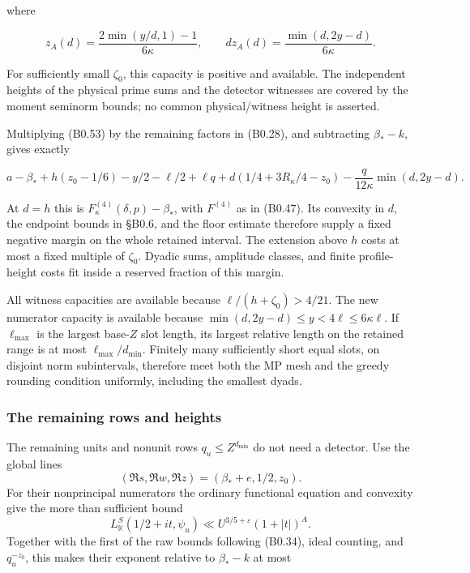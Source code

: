 \documentclass[11pt,a4paper]{article}
\begin{document}
where

\[
z_A(d)=\frac{2\min(y/d,1)-1}{6\kappa},\qquad
d z_A(d)=\frac{\min(d,2y-d)}{6\kappa}.
\tag{B0.54}
\]

For sufficiently small \(\zeta_0\), this capacity is positive and
available. The independent heights of the physical prime sums and the
detector witnesses are covered by the moment seminorm bounds; no common
physical/witness height is asserted.

Multiplying (B0.53) by the remaining factors in (B0.28), and subtracting
\(\beta_*-k\), gives exactly

\[
a-\beta_*+h(z_0-1/6)-y/2-\ell/2+\ell q
+d(1/4+3R_\kappa/4-z_0)
-\frac q{12\kappa}\min(d,2y-d).
\tag{B0.55}
\]

At \(d=h\) this is \(F^{(4)}_\kappa(\delta,\allowbreak{}p)-\beta_*\), with
\(F^{(4)}\) as in (B0.47). Its convexity in \(d\), the endpoint bounds
in §B0.6, and the floor estimate therefore supply a fixed negative
margin on the whole retained interval. The extension above \(h\) costs
at most a fixed multiple of \(\zeta_0\). Dyadic sums, amplitude classes,
and finite profile-height costs fit inside a reserved fraction of this
margin.

All witness capacities are available because \(\ell/(h+\zeta_0)>4/21\).
The new numerator capacity is available because
\(\min(d,\allowbreak{}2y-d)\le y<4\ell\le6\kappa\ell\). If \(\ell_{\max}\) is the
largest base-\(Z\) slot length, its largest relative length on the
retained range is at most \(\ell_{\max}/d_{\min}\). Finitely many
sufficiently short equal slots, on disjoint norm subintervals, therefore
meet both the MP mesh and the greedy rounding condition uniformly,
including the smallest dyads.

\hypertarget{the-remaining-rows-and-heights}{%
\subsubsection{The remaining rows and
heights}\label{the-remaining-rows-and-heights}}

The remaining units and nonunit rows \(q_u\le Z^{d_{\min}}\) do not need
a detector. Use the global lines \[
(\Re s,\Re w,\Re z)=(\beta_*+e,1/2,z_0).
\] For their nonprincipal numerators the ordinary functional equation
and convexity give the more than sufficient bound \[
L_{\mathbb K}^S(1/2+it,\psi_u)\ll U^{3/5+\varepsilon}(1+|t|)^A.
\] Together with the first of the raw bounds following (B0.34), ideal
counting, and \(q_u^{-z_0}\), this makes their exponent relative to
\(\beta_*-k\) at most
\end{document}

